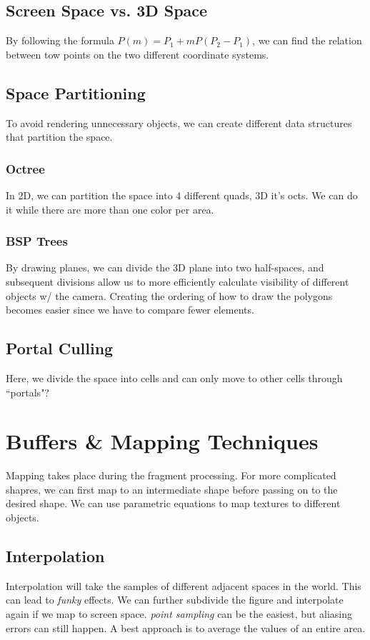\documentclass[landscape,4pt,a4paper]{article}
\begin{document}
\begin{multicols*}{5}
		\subsection{Screen Space vs. 3D Space}
				By following the formula $P(m) = P_{1} + mP(P_{2}-P_{1})$, we can find the relation between tow points on the 
				two different coordinate systems.
		\subsection{Space Partitioning}
				To avoid rendering unnecessary objects, we can create different data structures that partition the space. 
				\subsubsection{Octree}
					In 2D, we can partition the space into 4 different quads, 3D it's octs. We can do it while there are more
					than one color per area.
				\subsubsection{BSP Trees}
					By drawing planes, we can divide the 3D plane into two half-spaces, and subsequent divisions allow us to 
					more efficiently calculate visibility of different objects w/ the camera. Creating the ordering of how 
					to draw the polygons becomes easier since we have to compare fewer elements. 
				\subsection{Portal Culling}
					Here, we divide the space into cells and can only move to other cells through ``portals"?
	\section{Buffers \& Mapping Techniques}
			Mapping takes place during the fragment processing. For more complicated shapres, we can first map to an intermediate
			shape before passing on to the desired shape. We can use parametric equations to map textures to different objects.
			\subsection{Interpolation}	
				Interpolation will take the samples of different adjacent spaces in the world. This can lead to \textit{funky}
				effects. We can further subdivide the figure and interpolate again if we map to screen space. \textit{point sampling}
				can be the easiest, but aliasing errors can still happen. A best approach is to average the values of an entire area.

\end{multicols*}
\end{document}
